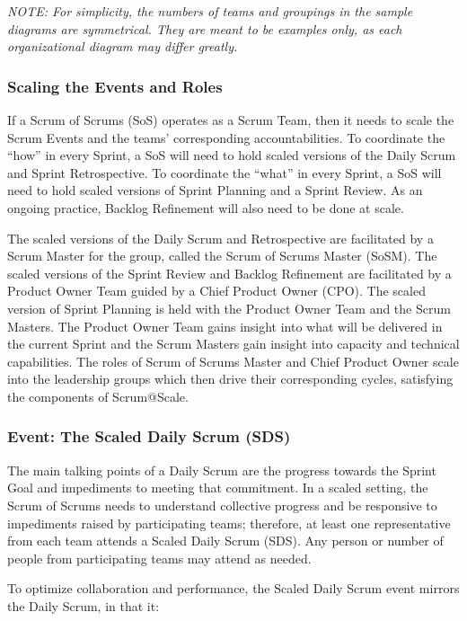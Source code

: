 \documentclass[12pt,a4paper,parskip=full]{scrartcl}
\begin{document}
\emph{NOTE: For simplicity, the numbers of teams and groupings in the
sample diagrams are symmetrical. They are meant to be examples only, as
each organizational diagram may differ greatly.}

\subsubsection{Scaling the Events and
Roles}\label{scaling-the-events-and-roles}

If a Scrum of Scrums (SoS) operates as a Scrum Team, then it needs to scale the Scrum Events and the teams' corresponding accountabilities. To coordinate the ``how'' in every Sprint, a SoS will need to hold scaled versions of the Daily Scrum and Sprint Retrospective. To coordinate the ``what'' in every Sprint, a SoS will need to hold scaled versions of Sprint Planning and a Sprint Review. As an ongoing practice, Backlog Refinement will also need to be done at scale.

The scaled versions of the Daily Scrum and Retrospective are facilitated by a Scrum Master for the group, called the Scrum of Scrums Master (SoSM). The scaled versions of the Sprint Review and Backlog Refinement are facilitated by a Product Owner Team guided by a Chief Product Owner (CPO). The scaled version of Sprint Planning is held with the Product Owner Team and the Scrum Masters. The Product Owner Team gains insight into what will be delivered in the current Sprint and the Scrum Masters gain insight into capacity and technical capabilities. The roles of Scrum of Scrums Master and Chief Product Owner scale into the leadership groups which then drive their corresponding cycles, satisfying the components of Scrum@Scale.


\subsubsection{Event: The Scaled Daily Scrum
(SDS)}\label{event-the-scaled-daily-scrum}


The main talking points of a Daily Scrum are the progress towards the Sprint Goal and impediments to meeting that commitment. In a scaled setting, the Scrum of Scrums needs to understand collective progress and be responsive to impediments raised by participating teams; therefore, at least one representative from each team attends a Scaled Daily Scrum (SDS). Any person or number of people from participating teams may attend as needed.

To optimize collaboration and performance, the Scaled Daily Scrum event mirrors the Daily Scrum, in that it:
\end{document}
